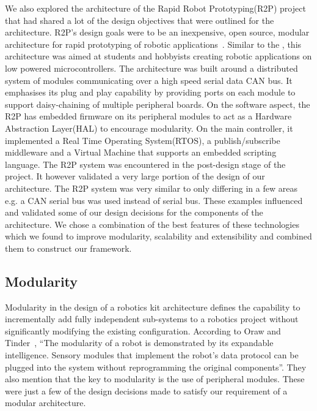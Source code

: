 We also explored the architecture of the Rapid Robot Prototyping(R2P) project that had shared a lot of the design objectives that were outlined for the \xten architecture. R2P's design goals were to be an inexpensive, open source, modular architecture for rapid prototyping of robotic applications~\parencite{r2p}. Similar to the \xten, this architecture was aimed at students and hobbyists creating robotic applications on low powered microcontrollers. The architecture was built around a distributed system of modules communicating over a high speed serial data CAN bus. It emphasises its plug and play capability by providing ports on each module to support daisy-chaining of multiple peripheral boards. On the software aspect, the R2P has embedded firmware on its peripheral modules to act as a Hardware Abstraction Layer(HAL) to encourage modularity. On the main controller, it implemented a Real Time Operating System(RTOS), a publish/subscribe middleware and a Virtual Machine that supports an embedded scripting language. The R2P system was encountered in the post-design stage of the \xten project. It however validated a very large portion of the design of our architecture. The R2P system was very similar to \xten only differing in a few areas e.g. a CAN serial bus was used instead of \iic serial bus. 
%
%
These examples influenced and validated some of our design decisions for the components of the \xten architecture. We chose a combination of the best features of these technologies which we found to improve modularity, scalability and extensibility and combined them to construct our framework. 






\subsection{Modularity} %
\label{sub:modularity}
Modularity in the design of a robotics kit architecture defines the capability to incrementally add fully independent sub-systems to a robotics project without significantly modifying the existing configuration. According to Oraw and Tinder~\parencite{mars}, ``The modularity of a robot is demonstrated by its expandable intelligence. Sensory modules that implement the robot's data protocol can be plugged into the system without reprogramming the original components''. They also mention that the key to modularity is the use of peripheral modules. These were just a few of the design decisions made to satisfy our requirement of a modular architecture. 

